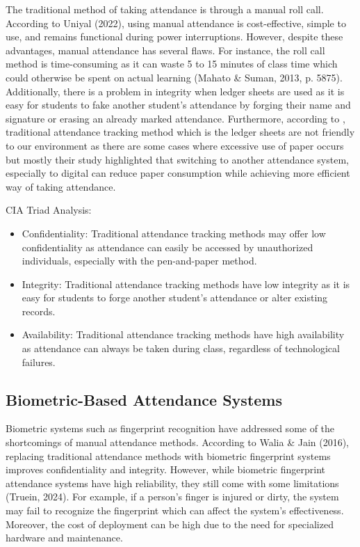 The traditional method of taking attendance is through a manual roll call. According to Uniyal (2022), using manual attendance is cost-effective, simple to use, and remains functional during power interruptions. However, despite these advantages, manual attendance has several flaws. For instance, the roll call method is time-consuming as it can waste 5 to 15 minutes of class time which could otherwise be spent on actual learning (Mahato \& Suman, 2013, p. 5875). Additionally, there is a problem in integrity when ledger sheets are used as it is easy for students to fake another student’s attendance by forging their name and signature or erasing an already marked attendance. Furthermore, according to \cite{dewa2020development},  traditional attendance tracking method which is the ledger sheets are not friendly to our environment as there are some cases where excessive use of paper occurs but mostly their study highlighted that switching to another attendance system, especially to digital can reduce paper consumption while achieving more efficient way of taking attendance.

CIA Triad Analysis:

\begin{itemize}
	\item Confidentiality: Traditional attendance tracking methods may offer low confidentiality as attendance can easily be accessed by unauthorized individuals, especially with the pen-and-paper method.
	\item Integrity: Traditional attendance tracking methods have low integrity as it is easy for students to forge another student's attendance or alter existing records.
	\item Availability: Traditional attendance tracking methods have high availability as attendance can always be taken during class, regardless of technological failures.
\end{itemize}

\subsection{Biometric-Based Attendance Systems}

Biometric systems such as fingerprint recognition have addressed some of the shortcomings of manual attendance methods. According to Walia \& Jain (2016), replacing traditional attendance methods with biometric fingerprint systems improves confidentiality and integrity. However, while biometric fingerprint attendance systems have high reliability, they still come with some limitations (Truein, 2024). For example, if a person’s finger is injured or dirty, the system may fail to recognize the fingerprint which can affect the system’s effectiveness. Moreover, the cost of deployment can be high due to the need for specialized hardware and maintenance.

